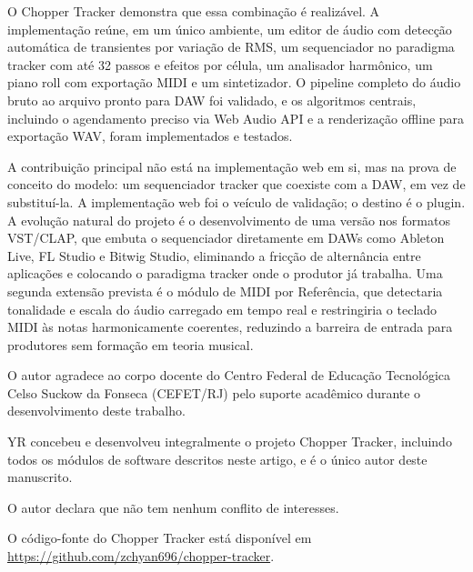 \documentclass[portuguese]{sbc2025}
\begin{document}
O Chopper Tracker demonstra que essa combinação é realizável. A implementação reúne, em um único ambiente, um editor de áudio com detecção automática de transientes por variação de RMS, um sequenciador no paradigma tracker com até 32 passos e efeitos por célula, um analisador harmônico, um piano roll com exportação MIDI e um sintetizador. O pipeline completo do áudio bruto ao arquivo pronto para DAW foi validado, e os algoritmos centrais, incluindo o agendamento preciso via Web Audio API e a renderização offline para exportação WAV, foram implementados e testados.

A contribuição principal não está na implementação web em si, mas na prova de conceito do modelo: um sequenciador tracker que coexiste com a DAW, em vez de substituí-la. A implementação web foi o veículo de validação; o destino é o plugin. A evolução natural do projeto é o desenvolvimento de uma versão nos formatos VST/CLAP, que embuta o sequenciador diretamente em DAWs como Ableton Live, FL Studio e Bitwig Studio, eliminando a fricção de alternância entre aplicações e colocando o paradigma tracker onde o produtor já trabalha. Uma segunda extensão prevista é o módulo de MIDI por Referência, que detectaria tonalidade e escala do áudio carregado em tempo real e restringiria o teclado MIDI às notas harmonicamente coerentes, reduzindo a barreira de entrada para produtores sem formação em teoria musical.


\begin{declarations}

\begin{acknowledgements}
O autor agradece ao corpo docente do Centro Federal de Educação Tecnológica Celso Suckow da Fonseca (CEFET/RJ) pelo suporte acadêmico durante o desenvolvimento deste trabalho.
\end{acknowledgements}

\begin{contributions}
YR concebeu e desenvolveu integralmente o projeto Chopper Tracker, incluindo todos os módulos de software descritos neste artigo, e é o único autor deste manuscrito.
\end{contributions}

\begin{interests}
O autor declara que não tem nenhum conflito de interesses.
\end{interests}

\begin{materials}
O código-fonte do Chopper Tracker está disponível em \url{https://github.com/zchyan696/chopper-tracker}.
\end{materials}

\end{declarations}




\end{document}
